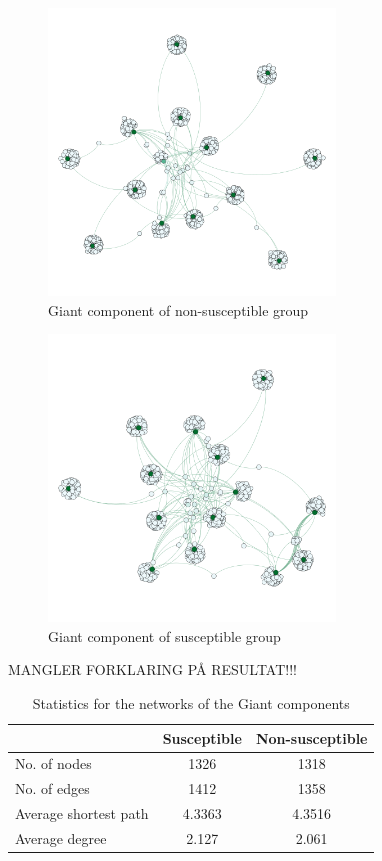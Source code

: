 \documentclass[10pt]{IEEEtran}
\begin{document}
\begin{figure}[H]
  \centering
  \includegraphics[width=3.0in]{non_rec_giant_component}
  \caption{Giant component of non-susceptible group}
  \label{fig:giant_comp_non_sus}
\end{figure}


\begin{figure}[H]
  \centering
  \includegraphics[width=3.0in]{rec_giant_component}
  \caption{Giant component of susceptible group}
  \label{fig:giant_comp_sus}
\end{figure} 


MANGLER FORKLARING PÅ RESULTAT!!!

\begin{table}[H]
\begin{tabular}{lcc}
\hline
                      & Susceptible & Non-susceptible \\ \hline
No. of nodes          & 1326        & 1318            \\
No. of edges          & 1412        & 1358            \\
Average shortest path & 4.3363      & 4.3516          \\
Average degree        & 2.127       & 2.061           \\ \hline
\end{tabular}
\caption{Statistics for the networks of the Giant components}
\end{table}
\end{document}
